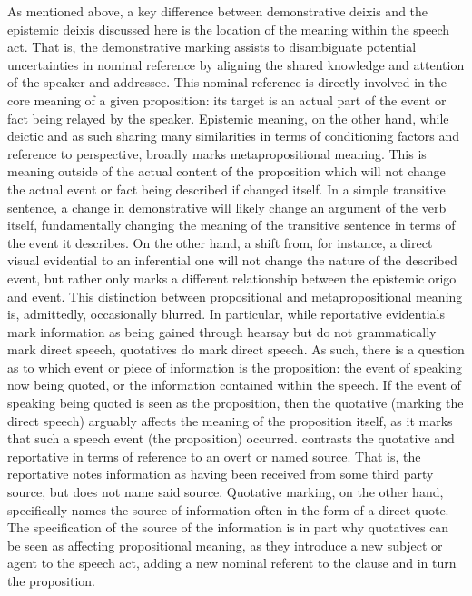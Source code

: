 As mentioned above, a key difference between demonstrative deixis and the epistemic deixis discussed here is the location of the meaning within the speech act. That is, the demonstrative marking assists to disambiguate potential uncertainties in nominal reference by aligning the shared knowledge and attention of the speaker and addressee. This nominal reference is directly involved in the core meaning of a given proposition: its target is an actual part of the event or fact being relayed by the speaker. Epistemic meaning, on the other hand, while deictic and as such sharing many similarities in terms of conditioning factors and reference to perspective, broadly marks metapropositional meaning. This is meaning outside of the actual content of the proposition which will not change the actual event or fact being described if changed itself. In a simple transitive sentence, a change in demonstrative will likely change an argument of the verb itself, fundamentally changing the meaning of the transitive sentence in terms of the event it describes. On the other hand, a shift from, for instance, a direct visual evidential to an inferential one will not change the nature of the described event, but rather only marks a different relationship between the epistemic origo and event. This distinction between propositional and metapropositional meaning is, admittedly, occasionally blurred. In particular, while reportative evidentials mark information as being gained through hearsay but do not grammatically mark direct speech, quotatives do mark direct speech. As such, there is a question as to which event or piece of information is the proposition: the event of speaking now being quoted, or the information contained within the speech. If the event of speaking being quoted is seen as the proposition, then the quotative (marking the direct speech) arguably affects the meaning of the proposition itself, as it marks that such a speech event (the proposition) occurred.  contrasts the quotative and reportative in terms of reference to an overt or named source. That is, the reportative notes information as having been received from some third party source, but does not name said source. Quotative marking, on the other hand, specifically names the source of information often in the form of a direct quote. The specification of the source of the information is in part why quotatives can be seen as affecting propositional meaning, as they introduce a new subject or agent to the speech act, adding a new nominal referent to the clause and in turn the proposition. 

